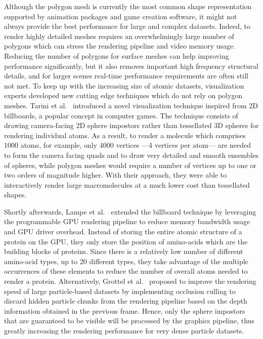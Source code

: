 Although the polygon mesh is currently the most common shape representation supported by animation packages and game creation software, it might not always provide the best performance for large and complex datasets.
Indeed, to render highly detailed meshes requires an overwhelmingly large number of polygons which can stress the rendering pipeline and video memory usage.
Reducing the number of polygons for surface meshes can help improving performance significantly, but it also removes important high frequency structural details, and for larger scenes real-time performance requirements are often still not met.
To keep up with the increasing size of atomic datasets, visualization experts developed new cutting edge techniques which do not rely on polygon meshes.
Tarini et al.~\cite{tarini2006ambient} introduced a novel visualization technique inspired from 2D billboards, a popular concept in computer games.
The technique consists of drawing camera-facing 2D sphere impostors rather than tessellated 3D spheres for rendering individual atoms.
As a result, to render a molecule which comprises 1000 atoms, for example, only 4000 vertices ---4 vertices per atom--- are needed to form the camera facing quads and to draw very detailed and smooth ensembles of spheres, while polygon meshes would require a number of vertices up to one or two orders of magnitude higher.
With their approach, they were able to interactively render large macromolecules at a much lower cost than tessellated shapes.

Shortly afterwards, Lampe et al.~\cite{lampe2007two} extended the billboard technique by leveraging the programmable GPU rendering pipeline to reduce memory bandwidth usage and GPU driver overhead. 
Instead of storing the entire atomic structure of a protein on the GPU, they only store the position of amino-acids which are the building blocks of proteins.
Since there is a relatively low number of different amino-acid types, up to 20 different types, they take advantage of the multiple occurrences of these elements to reduce the number of overall atoms needed to render a protein.
Alternatively, Grottel et al.~\cite{grottel2010coherent} proposed to improve the rendering speed of large particle-based datasets by implementing occlusion culling to discard hidden particle chunks from the rendering pipeline based on the depth information obtained in the previous frame.
Hence, only the sphere impostors that are guaranteed to be visible will be processed by the graphics pipeline, thus greatly increasing the rendering performance for very dense particle datasets.

